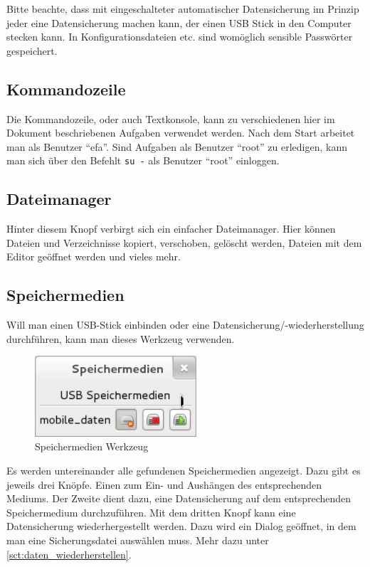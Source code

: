 \documentclass[a4paper,12pt,twoside]{article}
\begin{document}
Bitte beachte, dass mit eingeschalteter automatischer Datensicherung im
Prinzip jeder eine Datensicherung machen kann, der einen USB Stick in
den Computer stecken kann. In Konfigurationsdateien etc. sind womöglich
sensible Passwörter gespeichert.


\subsection{Kommandozeile}
\label{sct:kommandozeile}
Die Kommandozeile, oder auch Textkonsole, kann zu verschiedenen hier im
Dokument beschriebenen Aufgaben verwendet werden. Nach dem Start
arbeitet man als Benutzer "`efa"'. Sind
Aufgaben als Benutzer "`root"' zu erledigen,
kann man sich über den Befehlt \texttt{su -} als
Benutzer "`root"' einloggen.


\subsection{Dateimanager}
\label{sct:dateimanager}
Hinter diesem Knopf verbirgt sich ein einfacher Dateimanager. Hier
können Dateien und Verzeichnisse kopiert, verschoben, gelöscht werden,
Dateien mit dem Editor geöffnet werden und vieles mehr.


\subsection{Speichermedien}
\label{sct:dialog_speichermedien}
Will man einen USB-Stick einbinden
oder eine Datensicherung/-wiederherstellung durchführen, kann man
dieses Werkzeug verwenden.

\begin{figure}
    \centering
    \includegraphics[width=6cm]{efaLivede-img/efaLivede-img20.png}
    \caption{Speichermedien Werkzeug}
    \label{fig:dialog_speichermedien}
\end{figure}

Es werden untereinander alle gefundenen Speichermedien angezeigt. Dazu
gibt es jeweils drei Knöpfe. Einen zum Ein- und Aushängen des
entsprechenden Mediums. Der Zweite dient dazu, eine Datensicherung auf
dem entsprechenden Speichermedium durchzuführen. Mit dem dritten Knopf
kann eine Datensicherung wiederhergestellt werden. Dazu wird ein Dialog
geöffnet, in dem man eine Sicherungsdatei auswählen muss. Mehr dazu unter
\ref{sct:daten_wiederherstellen}.
\end{document}
